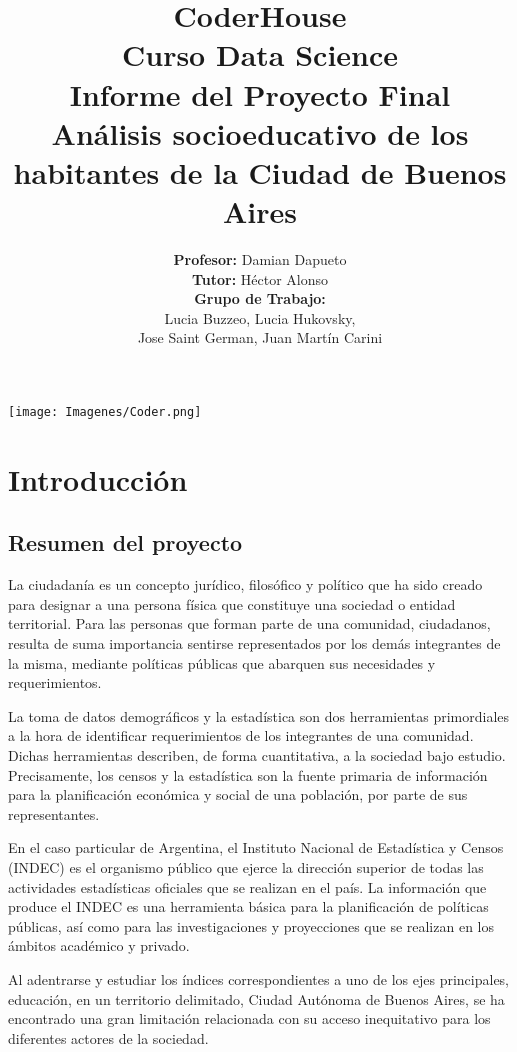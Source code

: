 \documentclass[a4paper]{article}
\title{\textbf{CoderHouse \\ \vspace{0.5cm} Curso Data Science \\ \vspace{0.5cm} Informe del Proyecto Final\\ \vspace{0.5cm}
Análisis socioeducativo de los habitantes de la Ciudad de Buenos Aires}}
\author{\textbf{Profesor:} Damian Dapueto \\ \vspace{0.2cm} \textbf{Tutor:} Héctor Alonso \\ \vspace{0.2cm} \textbf{Grupo de Trabajo:} \\ Lucia Buzzeo, Lucia Hukovsky,\\ Jose Saint German, Juan Martín Carini}
\begin{document}
\maketitle

\begin{center}
    \texttt{[image: Imagenes/Coder.png]}
\end{center}
 
\thispagestyle{empty}
 
\newpage
 
\tableofcontents
 
\newpage

\section{Introducción}

    \subsection{Resumen del proyecto}

        La ciudadanía es un concepto jurídico, filosófico y político que ha sido creado para designar a una persona física que constituye una sociedad o entidad territorial. Para las personas que forman parte de una comunidad, ciudadanos, resulta de suma importancia sentirse representados por los demás integrantes de la misma, mediante políticas públicas que abarquen sus necesidades y requerimientos. 

        La toma de datos demográficos y la estadística son dos herramientas primordiales a la hora de identificar requerimientos de los integrantes de una comunidad. Dichas herramientas describen, de forma cuantitativa, a la sociedad bajo estudio. Precisamente, los censos y la estadística son la fuente primaria de información para la planificación económica y social de una población, por parte de sus representantes.

        En el caso particular de Argentina, el Instituto Nacional de Estadística y Censos (INDEC) es el organismo público que ejerce la dirección superior de todas las actividades estadísticas oficiales que se realizan en el país. La información que produce el INDEC es una herramienta básica para la planificación de políticas públicas, así como para las investigaciones y proyecciones que se realizan en los ámbitos académico y privado.

        Al adentrarse y estudiar los índices correspondientes a uno de los ejes principales, educación, en un territorio delimitado, Ciudad Autónoma de Buenos Aires, se ha encontrado una gran limitación relacionada con su acceso inequitativo para los diferentes actores de la sociedad. 
\end{document}
